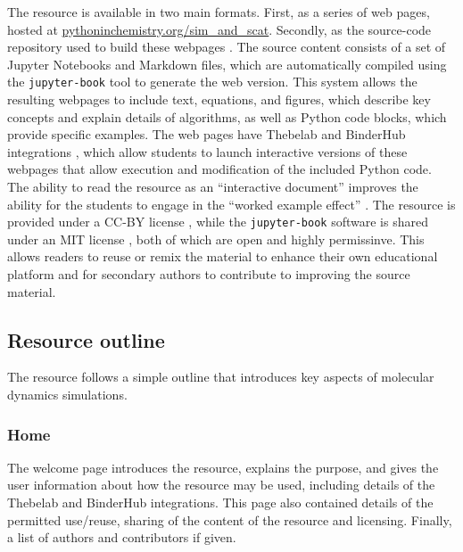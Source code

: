 The resource is available in two main formats.
First, as a series of web pages, hosted at \href{https://pythoninchemistry.org/sim_and_scat}{pythoninchemistry.org/sim\_and\_scat}.
Secondly, as the source-code repository used to build these webpages \cite{mccluskey_pythoninchemistry/sim_and_scat_2019}.
The source content consists of a set of Jupyter Notebooks and Markdown files, which are automatically compiled using the \texttt{jupyter-book} tool \cite{lau_jupyter/jupyter-book_2019} to generate the web version.
This system allows the resulting webpages to include text, equations, and figures, which describe key concepts and explain details of algorithms, as well as Python code blocks, which provide specific examples.
The web pages have Thebelab and BinderHub integrations \cite{ragan-kelley_minrk/thebelab_2019, ragan-kelley_jupyterhub/binderhub_2019, jupyter_binder_2018}, which allow students to launch interactive versions of these webpages that allow execution and modification of the included Python code.
The ability to read the resource as an ``interactive document'' improves the ability for the students to engage in the ``worked example effect'' \cite{tarmizi_guidance_1988}.
The resource is provided under a CC-BY license \cite{creative_commons_creative_2019}, while the \texttt{jupyter-book} software is shared under an MIT license \cite{open_source_mit_2019}, both of which are open and highly permissinve.
This allows readers to reuse or remix the material to enhance their own educational platform and for secondary authors to contribute to improving the source material.

\subsection{Resource outline}

The resource follows a simple outline that introduces key aspects of molecular dynamics simulations.

\subsubsection{Home}

The welcome page introduces the resource, explains the purpose, and gives the user information about how the resource may be used, including details of the Thebelab and BinderHub integrations.
This page also contained details of the permitted use/reuse, sharing of the content of the resource and licensing.
Finally, a list of authors and contributors if given.

